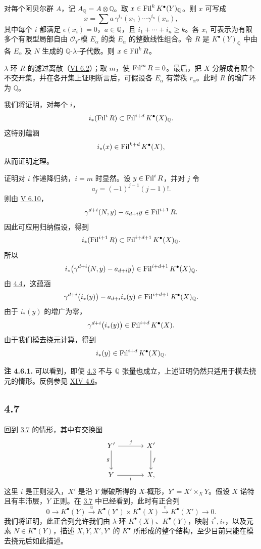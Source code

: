 对每个阿贝尔群 \(A\)，记 \(A_{\mathbb Q}=A\otimes\mathbb Q\)。取 \(x\in\operatorname{Fil}^kK^\bullet(Y)_{\mathbb Q}\)。则 \(x\) 可写成
\[
  x=\sum a\,\gamma^{i_1}(x_1)\cdots\gamma^{i_n}(x_n),
\]
其中每个 \(i\) 都满足 \(\epsilon(x_i)=0\)，\(a\in\mathbb Q\)，且 \(i_1+\cdots+i_n\ge k\)。各 \(x_i\) 可表示为有限多个有限型局部自由 \(\mathcal O_Y\)-模 \(E_\alpha\) 的类 \(E_\alpha\) 的整数线性组合。令 \(R\) 是 \(K^\bullet(Y)_{\mathbb Q}\) 中由各 \(E_\alpha\) 及 \(N\) 生成的 \(\mathbb Q\)-\(\lambda\)-子代数。则 \(x\in\operatorname{Fil}^kR\)。

\(\lambda\)-环 \(R\) 的滤过离散（\hyperlink{sga6.e06.prop.6-2}{VI 6.2}）；取 \(m\)，使 \(\operatorname{Fil}^mR=0\)。最后，把 \(X\) 分解成有限个不交开集，并在各开集上证明断言后，可假设各 \(E_\alpha\) 有常秩 \(r_\alpha\)。此时 \(R\) 的增广环为 \(\mathbb Q\)。

我们将证明，对每个 \(i\)，
\[
  i_*(\operatorname{Fil}^iR)\subset \operatorname{Fil}^{i+d}K^\bullet(X)_{\mathbb Q}.
\]
这特别蕴涵
\[
  i_*(x)\in\operatorname{Fil}^{k+d}K^\bullet(X),
\]
从而证明定理。

证明对 \(i\) 作递降归纳，\(i=m\) 时显然。设 \(y\in\operatorname{Fil}^iR\)，并对 \(j\) 令
\[
  a_j=(-1)^{j-1}(j-1)!.
\]
则由 \hyperlink{sga6.e05.prop.6-10}{V 6.10}，
\[
  \gamma^{d+i}(N,y)-a_{d+i}y\in\operatorname{Fil}^{i+1}R.
\]
因此可应用归纳假设，得到
\[
  i_*(\operatorname{Fil}^{i+1}R)\subset\operatorname{Fil}^{i+d+1}K^\bullet(X)_{\mathbb Q}.
\]
所以
\[
  i_*\bigl(\gamma^{d+i}(N,y)-a_{d+i}y\bigr)
  \in\operatorname{Fil}^{i+d+1}K^\bullet(X)_{\mathbb Q}.
\]
由 \hyperlink{sga6.e07.cor.4-4}{4.4}，这蕴涵
\[
  \gamma^{d+i}\bigl(i_*(y)\bigr)-a_{d+i}i_*(y)
  \in\operatorname{Fil}^{i+d+1}K^\bullet(X)_{\mathbb Q}.
\]
由于 \(i_*(y)\) 的增广为零，
\[
  \gamma^{d+i}\bigl(i_*(y)\bigr)\in\operatorname{Fil}^{i+d}K^\bullet(X).
\]
由于我们模去挠元计算，得到
\[
  i_*(y)\in\operatorname{Fil}^{i+d}K^\bullet(X)_{\mathbb Q}.
\]

\textbf{注 4.6.1.} 可以看到，即使 \hyperlink{sga6.e07.thm.4-3}{4.3} 不与 \(\mathbb Q\) 张量也成立，上述证明仍然只适用于模去挠元的情形。反例参见 \hyperlink{sga6.e14.para.4-6}{XIV 4.6}。

\subsection*{4.7}

回到 \hyperlink{sga6.e07.thm.3-7}{3.7} 的情形，其中有交换图
\[
\begin{tikzcd}[column sep=large,row sep=large]
Y' \arrow[r,"j"] \arrow[d,"g"'] & X' \arrow[d,"f"]\\
Y \arrow[r,"i"'] & X,
\end{tikzcd}
\]
这里 \(i\) 是正则浸入，\(X'\) 是沿 \(Y\) 爆破所得的 \(X\)-概形，\(Y'=X'\times_XY\)。假设 \(X\) 诺特且有丰沛层，\(Y\) 正则。在 \hyperlink{sga6.e07.thm.3-7}{3.7} 中已经看到，此时有正合列
\[
0\longrightarrow K^\bullet(Y)\xrightarrow{u}
K^\bullet(Y')\times K^\bullet(X)\xrightarrow{v}
K^\bullet(X')\longrightarrow0.
\]
我们将证明，此正合列允许我们由 \(\lambda\)-环 \(K^\bullet(X)\)、\(K^\bullet(Y)\)，映射 \(i^*,i_*\)，以及元素 \(N\in K^\bullet(Y)\)，描述 \(X,Y,X',Y'\) 的 \(K^\bullet\) 所形成的整个结构，至少目前只能在模去挠元后如此描述。

